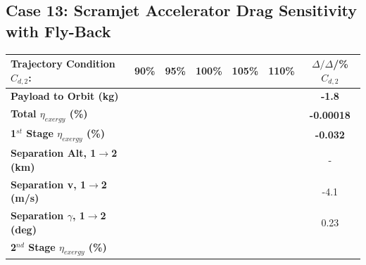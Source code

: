 \subsection{Case 13: Scramjet Accelerator Drag Sensitivity with Fly-Back}\label{sec:dragvar}


\begin{table}[ht]%
	\centering
	\begin{tabular}{l c c c c c c} 
		\hline \textbf{Trajectory Condition}   \qquad  $C_{d,2}$:
		&90\%
		&95\%
		&100\%
		&105\%
		&110\%
		& $\Delta/\Delta$/\%$C_{d,2}$
		\\
		\hline \textbf{Payload to Orbit (kg)}
		& \textbf{\PayloadToOrbitCdNinety}
		& \textbf{\PayloadToOrbitCdNinetyFive}
		& \textbf{\PayloadToOrbitCdStandard}
		& \textbf{\PayloadToOrbitCdOneHundredFive}
		& \textbf{\PayloadToOrbitCdOneHundredTen}
		&\textbf{-1.8}
		\\
		\textbf{Total $\eta_{exergy}$ (\%)}
		& \textbf{\totalExergyEffCdNinety}
		& \textbf{\totalExergyEffCdNinetyFive}
		& \textbf{\totalExergyEffCdStandard}
		& \textbf{\totalExergyEffCdOneHundredFive}
		& \textbf{\totalExergyEffCdOneHundredTen}
		& \textbf{-0.00018}
		\\
		\hline 
		\textbf{1$^{st}$ Stage $\eta_{exergy}$ (\%)}
		& \textbf{\firstExergyEffCdNinety}
		& \textbf{\firstExergyEffCdNinetyFive}
		& \textbf{\firstExergyEffCdStandard}
		& \textbf{\firstExergyEffCdOneHundredFive}
		& \textbf{\firstExergyEffCdOneHundredTen}
		& \textbf{-0.032}
		\\
		\textbf{Separation Alt, 1$\rightarrow$2 (km)}
		& \firstsecondSeparationAltCdNinety
		& \firstsecondSeparationAltCdNinetyFive
		& \firstsecondSeparationAltCdStandard
		& \firstsecondSeparationAltCdOneHundredFive
		& \firstsecondSeparationAltCdOneHundredTen
		& -
		\\
		\textbf{Separation v, 1$\rightarrow$2 (m/s)}
		& \firstsecondSeparationvCdNinety
		& \firstsecondSeparationvCdNinetyFive
		& \firstsecondSeparationvCdStandard
		& \firstsecondSeparationvCdOneHundredFive
		& \firstsecondSeparationvCdOneHundredTen
		&-4.1
		\\
		\textbf{Separation $\gamma$, 1$\rightarrow$2 (deg)}
		& \firstsecondSeparationgammaCdNinety
		& \firstsecondSeparationgammaCdNinetyFive
		& \firstsecondSeparationgammaCdStandard
		& \firstsecondSeparationgammaCdOneHundredFive
		& \firstsecondSeparationgammaCdOneHundredTen
		&0.23
		\\
		\hline 
		\textbf{2$^{nd}$ Stage $\eta_{exergy}$ (\%)}
		& \textbf{\secondExergyEffCdNinety}

\end{tabular}
\end{table}
